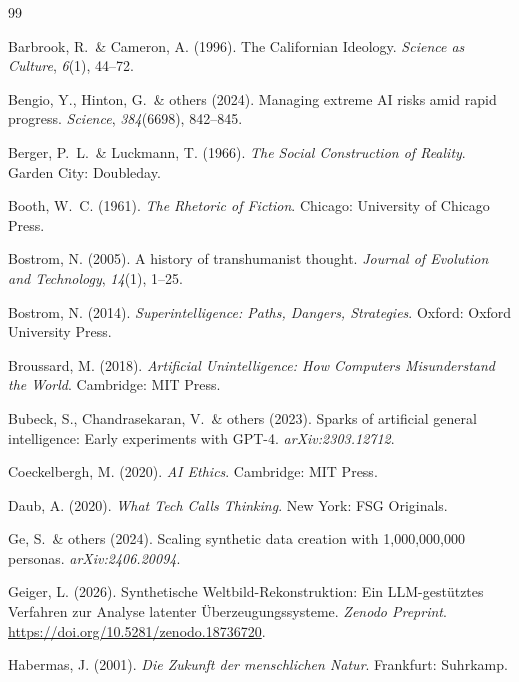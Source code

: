 \documentclass[12pt,a4paper]{article}
\begin{document}
\begin{thebibliography}{99}

  Barbrook, R.~\& Cameron, A. (1996).
  The Californian Ideology.
  \textit{Science as Culture}, \textit{6}(1), 44--72.

  Bengio, Y., Hinton, G.~\& others (2024).
  Managing extreme AI risks amid rapid progress.
  \textit{Science}, \textit{384}(6698), 842--845.

  Berger, P.~L.~\& Luckmann, T. (1966).
  \textit{The Social Construction of Reality}.
  Garden City: Doubleday.

  Booth, W.~C. (1961).
  \textit{The Rhetoric of Fiction}.
  Chicago: University of Chicago Press.

  Bostrom, N. (2005).
  A history of transhumanist thought.
  \textit{Journal of Evolution and Technology}, \textit{14}(1), 1--25.

  Bostrom, N. (2014).
  \textit{Superintelligence: Paths, Dangers, Strategies}.
  Oxford: Oxford University Press.

  Broussard, M. (2018).
  \textit{Artificial Unintelligence: How Computers Misunderstand the World}.
  Cambridge: MIT Press.

  Bubeck, S., Chandrasekaran, V.~\& others (2023).
  Sparks of artificial general intelligence: Early experiments with GPT-4.
  \textit{arXiv:2303.12712}.

  Coeckelbergh, M. (2020).
  \textit{AI Ethics}.
  Cambridge: MIT Press.

  Daub, A. (2020).
  \textit{What Tech Calls Thinking}.
  New York: FSG Originals.

  Ge, S.~\& others (2024).
  Scaling synthetic data creation with 1{,}000{,}000{,}000 personas.
  \textit{arXiv:2406.20094}.

  Geiger, L. (2026).
  Synthetische Weltbild-Rekonstruktion: Ein LLM-gest\"utztes Verfahren zur Analyse latenter \"Uberzeugungssysteme.
  \textit{Zenodo Preprint}. \url{https://doi.org/10.5281/zenodo.18736720}.

  Habermas, J. (2001).
  \textit{Die Zukunft der menschlichen Natur}.
  Frankfurt: Suhrkamp.


\end{thebibliography}
\end{document}
